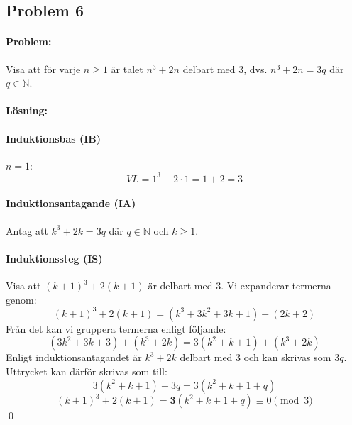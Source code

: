 \subsection*{Problem 6}

\paragraph{Problem:}  Visa att för varje $n\ge 1$ är talet $n^3+2n$ delbart med 3, dvs. $n^3+2n = 3q$ där $q \in \mathbb{N}$.

\paragraph{Lösning:}

\paragraph{Induktionsbas (IB)} $n=1$:
\[VL = 1^3+2\cdot 1 = 1+2 = 3\]

\paragraph{Induktionsantagande (IA)} Antag att \(k^3+2k= 3q\) där \(q \in \mathbb{N}\) och $k \ge1$.

\paragraph{Induktionssteg (IS)} Visa att \((k+1)^3+2(k+1)\) är delbart med 3.\newline
Vi expanderar termerna genom:
\[(k+1)^3+2(k+1)=(k^3+3k^2+3k+1) + (2k+2)\]
Från det kan vi gruppera termerna enligt följande:
\[(3k^2+3k+3)+(k^3+2k) = 3(k^2+k+1) + (k^3+2k)\]
Enligt induktionsantagandet är $k^3+2k$ delbart med 3 och kan skrivas som $3q$. Uttrycket kan därför skrivas som till:
\[3(k^2+k+1) + 3q = 3(k^2+k+1+q)\]
\[(k+1)^3+2(k+1)=\boldsymbol{3}(k^2+k+1+q) \equiv 0 \pmod{3}\]
\hfill\qed